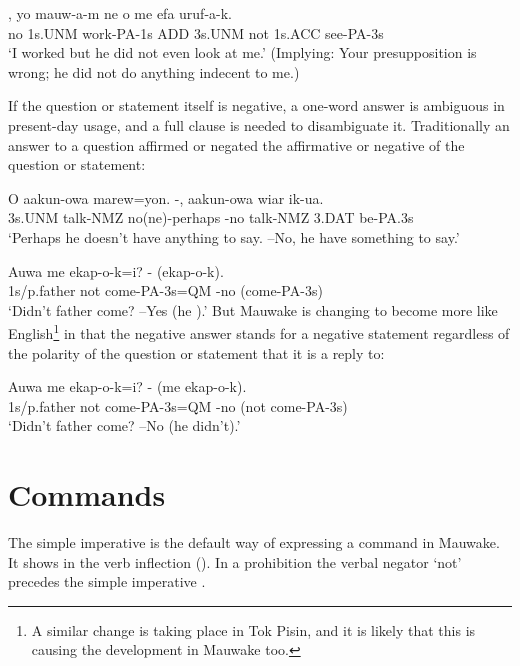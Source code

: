 \ea%
\label{ex:x1224}
\gll {},  yo  mauw-a-m  ne  o  me  efa  uruf-a-k.\\
no  1s.UNM  work-PA-1s  ADD  3s.UNM  not  1s.ACC  see-PA-3s     \\
\glt `I worked but he did not even look at me.' (Implying: Your presupposition is wrong; he did not do anything indecent to me.)
\z

 
If the question or statement itself is negative, a one-word answer is ambiguous in present-day usage, and a full clause is needed to disambiguate it. Traditionally an answer to a question affirmed or negated the affirmative or negative  of the question or statement:

\ea%
\label{ex:x1151}
\gll O  aakun-owa  marew=yon.  -,  aakun-owa  wiar  ik-ua.\\
3s.UNM  talk-NMZ  no(ne)-perhaps  -no  talk-NMZ  3.DAT be-PA.3s     \\
\glt `Perhaps he doesn't have anything to say. --No, he  have something to say.'
\z









\ea%
\label{ex:x1117}
\gll Auwa  me  ekap-o-k=i?  -  (ekap-o-k). \\
 1s/p.father  not  come-PA-3s=QM  -no  (come-PA-3s)     \\
\glt `Didn't father come? --Yes (he ).'
\z
But Mauwake is changing to become more like English\footnote{A similar change is taking place in Tok Pisin, and it is likely that this is causing the development in Mauwake too.} in that the negative answer stands for a negative statement regardless of the polarity of the question or statement that it is a reply to: 

\ea%
\label{ex:x1118}
\gll Auwa  me  ekap-o-k=i?  -  (me  ekap-o-k). \\
 1s/p.father  not  come-PA-3s=QM  -no  (not  come-PA-3s)     \\
\glt `Didn't father come? --No (he didn't).'
\z





\section{Commands}
\hypertarget{RefHeading22881935131865}{}
The simple imperative is the default way of expressing a command in Mauwake. It shows in the verb inflection (). In a prohibition the verbal negator  `not' precedes the simple imperative .

